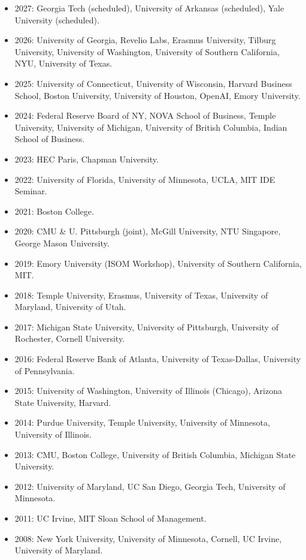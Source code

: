 \documentclass[10pt,letterpaper]{article}
\begin{document}
\begin{itemize}
\item 2027: Georgia Tech (scheduled), University of Arkansas (scheduled), Yale University (scheduled).
\item 2026: University of Georgia, Revelio Labs, Erasmus University, Tilburg University, University of Washington, University of Southern California, NYU, University of Texas.
\item 2025: University of Connecticut, University of Wisconsin, Harvard Business School, Boston University, University of Houston, OpenAI, Emory University.
\item 2024: Federal Reserve Board of NY, NOVA School of Business, Temple University, University of Michigan, University of British Columbia, Indian School of Business.
\item 2023: HEC Paris, Chapman University.
\item 2022: University of Florida, University of Minnesota, UCLA, MIT IDE Seminar.
\item 2021: Boston College.
\item 2020: CMU \& U. Pittsburgh (joint), McGill University, NTU Singapore, George Mason University.
\item 2019: Emory University (ISOM Workshop), University of Southern California, MIT.
\item 2018: Temple University, Erasmus, University of Texas, University of Maryland, University of Utah.
\item 2017: Michigan State University, University of Pittsburgh, University of Rochester, Cornell University.
\item 2016: Federal Reserve Bank of Atlanta, University of Texas-Dallas, University of Pennsylvania.
\item 2015: University of Washington, University of Illinois (Chicago), Arizona State University, Harvard.
\item 2014: Purdue University, Temple University, University of Minnesota, University of Illinois.
\item 2013: CMU, Boston College, University of British Columbia, Michigan State University.
\item 2012: University of Maryland, UC San Diego, Georgia Tech, University of Minnesota.
\item 2011: UC Irvine, MIT Sloan School of Management.
\item 2008: New York University, University of Minnesota, Cornell, UC Irvine, University of Maryland.
\end{itemize}
\end{document}
